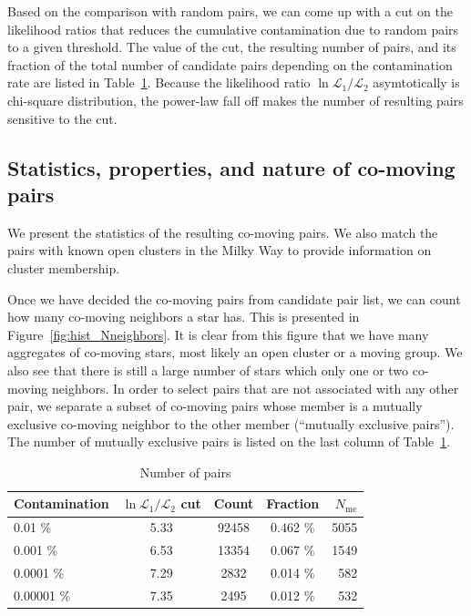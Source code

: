 \documentclass[manuscript, letterpaper]{aastex6}
\begin{document}
Based on the comparison with random pairs, we can come up with a cut
on the likelihood ratios that reduces the cumulative contamination due to random pairs
to a given threshold.
The value of the cut, the resulting number of pairs, and
its fraction of the total number of candidate pairs
depending on the contamination rate are listed in
Table~\ref{tab:candidatecounts}.
Because the likelihood ratio $\ln \mathcal{L}_1 /\mathcal{L}_2$ asymtotically
is chi-square distribution, the power-law fall off makes the number of resulting
pairs sensitive to the cut.

\subsection{Statistics, properties, and nature of co-moving pairs}

We present the statistics of the resulting co-moving pairs.
We also match the pairs with known open clusters in the Milky Way to
provide information on cluster membership.

Once we have decided the co-moving pairs from candidate pair list,
we can count how many co-moving neighbors a star has.
This is presented in Figure~\ref{fig:hist_Nneighbors}.
It is clear from this figure that we have many aggregates of co-moving stars, most
likely an open cluster or a moving group. We also see that there is still
a large number of stars which only one or two co-moving neighbors.
In order to select pairs that are not associated with any other pair,
we separate a subset of co-moving pairs whose member is a mutually exclusive
co-moving neighbor to the other member (``mutually exclusive pairs'').
The number of mutually exclusive pairs is listed on the last column of
Table~\ref{tab:candidatecounts}.

\begin{table}[tbh]
  \caption{Number of pairs}
  \label{tab:candidatecounts}
  \centering

  \begin{tabular}{l|c|c|c|r}
  \hline

  \hline
  \textbf{Contamination} & \textbf{$\ln \mathcal{L}_1 /\mathcal{L}_2$ cut} &
    \textbf{Count} & \textbf{Fraction} & \textbf{$N_\textrm{me}$} \\
  \hline
    0.01    \% & 5.33 & 92458 & 0.462 \% & 5055 \\
    0.001   \% & 6.53 & 13354 & 0.067 \% & 1549 \\
    0.0001  \% & 7.29 &  2832 & 0.014 \% & 582  \\
    0.00001 \% & 7.35 &  2495 & 0.012 \% & 532  \\
  \hline
  \end{tabular}
\end{table}
\end{document}
